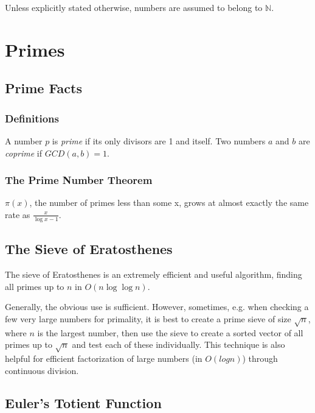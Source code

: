 \documentclass[../main]{subfiles}
\begin{document}
Unless explicitly stated otherwise, numbers are assumed to belong to $\mathbb{N}$.

\section{Primes}

    \subsection{Prime Facts}

    \subsubsection*{Definitions}

    A number $p$ is \textit{prime} if its only divisors are 1 and itself. Two numbers $a$ and $b$ are \textit{coprime} if $GCD(a, b) = 1$. 

    \subsubsection*{The Prime Number Theorem}

    $\pi(x)$, the number of primes less than some x, grows 
    at almost exactly the same rate as $\frac{x}{\log{x}-1}$.

    \subsection{The Sieve of Eratosthenes}

    The sieve of Eratosthenes is an extremely efficient and useful algorithm, finding all primes up to $n$ in $O(n\log\log{n})$.


    Generally, the obvious use is sufficient. However, sometimes, e.g. when checking a few very large numbers for primality, it is best to create a prime sieve of size $\sqrt{n}$, where $n$ is the largest number, then use the sieve to create a sorted vector of all primes up to $\sqrt{n}$ and test each of these individually. This technique is also helpful for efficient factorization of large numbers (in $O(log n)$) through continuous division.


    \subsection{Euler's Totient Function}
\end{document}
